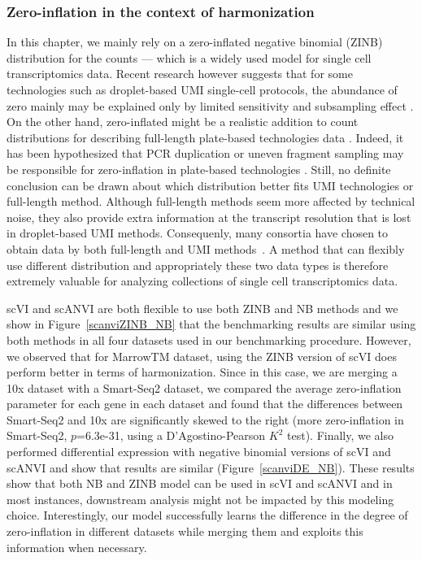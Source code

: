 \subsubsection{Zero-inflation in the context of harmonization}
 In this chapter, we mainly rely on a zero-inflated negative binomial (ZINB) distribution for the counts --- which is a widely used model for single cell transcriptomics data. Recent research however suggests that for some technologies such as droplet-based UMI single-cell protocols, the abundance of zero mainly may be explained only by limited sensitivity and subsampling effect \cite{svensson2019droplet}. On the other hand, zero-inflated might be a realistic addition to count distributions for describing full-length plate-based technologies data \cite{vieth2017powsimr}. Indeed, it has been hypothesized that PCR duplication or uneven fragment sampling may be responsible for zero-inflation in plate-based technologies \cite{svensson2019droplet}. Still, no definite conclusion can be drawn about which distribution better fits UMI technologies or full-length method. Although full-length methods seem more affected by technical noise, they also provide extra information at the transcript resolution that is lost in droplet-based UMI methods. Consequenly, many consortia have chosen to obtain data by both full-length and UMI methods~\cite{quake2018single,ecker2017brain}. A method that can flexibly use different distribution and appropriately these two data types is therefore extremely valuable for analyzing collections of single cell transcriptomics data. 
 
 scVI and scANVI are both flexible to use both ZINB and NB methods and we show in Figure~\ref{scanviZINB_NB} that the benchmarking results are similar using both methods in all four datasets used in our benchmarking procedure. However, we observed that for MarrowTM dataset, using the ZINB version of scVI does perform better in terms of harmonization. Since in this case, we are merging a 10x dataset with a Smart-Seq2 dataset, we compared the average zero-inflation parameter for each gene in each dataset and found that the differences between Smart-Seq2 and 10x are significantly skewed to the right (more zero-inflation in Smart-Seq2, $p$=6.3e-31, using a D'Agostino-Pearson $K^2$ test). Finally, we also performed differential expression with negative binomial versions of scVI and scANVI and show that results are similar (Figure~\ref{scanviDE_NB}). These results show that both NB and ZINB model can be used in scVI and scANVI and in most instances, downstream analysis might not be impacted by this modeling choice. Interestingly, our model successfully learns the difference in the degree of zero-inflation in different datasets while merging them and exploits this information when necessary.
 

